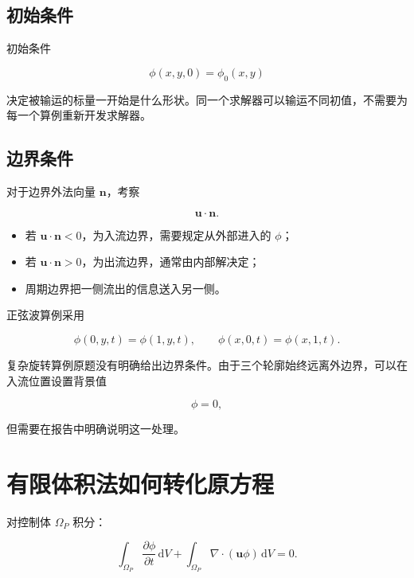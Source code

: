 \documentclass[UTF8,12pt,a4paper,fontset=fandol]{ctexart}
\begin{document}
\subsection{初始条件}

初始条件

\begin{equation}
\phi(x,y,0)=\phi_0(x,y)
\end{equation}

决定被输运的标量一开始是什么形状。同一个求解器可以输运不同初值，不需要为每一个算例重新开发求解器。

\subsection{边界条件}

对于边界外法向量 $\bm n$，考察

\begin{equation}
\bm u\cdot\bm n.
\end{equation}

\begin{itemize}
  \item 若 $\bm u\cdot\bm n<0$，为入流边界，需要规定从外部进入的 $\phi$；
  \item 若 $\bm u\cdot\bm n>0$，为出流边界，通常由内部解决定；
  \item 周期边界把一侧流出的信息送入另一侧。
\end{itemize}

正弦波算例采用

\begin{equation}
\phi(0,y,t)=\phi(1,y,t),
\qquad
\phi(x,0,t)=\phi(x,1,t).
\end{equation}

复杂旋转算例原题没有明确给出边界条件。由于三个轮廓始终远离外边界，可以在入流位置设置背景值

\begin{equation}
\phi=0,
\end{equation}

但需要在报告中明确说明这一处理。

\section{有限体积法如何转化原方程}

对控制体 $\Omega_P$ 积分：

\begin{equation}
\int_{\Omega_P}
\frac{\partial\phi}{\partial t}\,\mathrm dV
+
\int_{\Omega_P}
\nabla\cdot(\bm u\phi)\,\mathrm dV
=0.
\end{equation}
\end{document}
